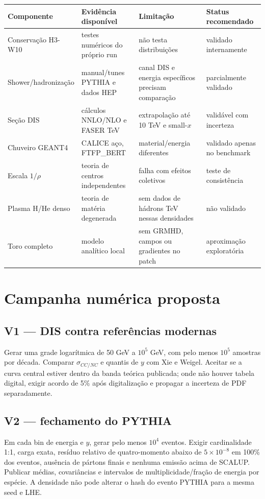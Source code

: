 \documentclass[11pt,a4paper]{article}
\begin{document}
{\footnotesize
\begin{longtable}{p{}p{}p{}p{}}
\toprule
Componente & Evidência disponível & Limitação & Status recomendado \\
\midrule\endhead
Conservação H3-W10 & testes numéricos do próprio run & não testa distribuições & validado internamente \\
Shower/hadronização & manual/tunes PYTHIA e dados HEP & canal DIS e energia específicos precisam comparação & parcialmente validado \\
Seção DIS & cálculos NNLO/NLO e FASER TeV & extrapolação até 10 TeV e small-$x$ & validável com incerteza \\
Chuveiro GEANT4 & CALICE aço, FTFP\_BERT & material/energia diferentes & validado apenas no benchmark \\
Escala $1/\rho$ & teoria de centros independentes & falha com efeitos coletivos & teste de consistência \\
Plasma H/He denso & teoria de matéria degenerada & sem dados de hádrons TeV nessas densidades & não validado \\
Toro completo & modelo analítico local & sem GRMHD, campos ou gradientes no patch & aproximação exploratória \\
\bottomrule
\end{longtable}
}

\section{Campanha numérica proposta}

\subsection*{V1 --- DIS contra referências modernas}
Gerar uma grade logarítmica de 50 GeV a $10^5$ GeV, com pelo menos $10^5$
amostras por década. Comparar $\sigma_{CC/NC}$ e quantis de $y$ com Xie e
Weigel. Aceitar se a curva central estiver dentro da banda teórica publicada;
onde não houver tabela digital, exigir acordo de 5\% após digitalização e
propagar a incerteza de PDF separadamente.

\subsection*{V2 --- fechamento do PYTHIA}
Em cada bin de energia e $y$, gerar pelo menos $10^4$ eventos. Exigir
cardinalidade 1:1, carga exata, resíduo relativo de quatro-momento abaixo de
$5\times10^{-8}$ em 100\% dos eventos, ausência de pártons finais e nenhuma
emissão acima de SCALUP. Publicar médias, covariâncias e intervalos de
multiplicidade/fração de energia por espécie. A densidade não pode alterar o
hash do evento PYTHIA para a mesma seed e LHE.
\end{document}
